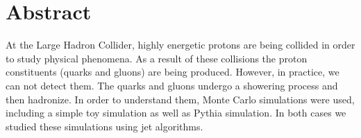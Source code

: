 
\chapter*{Abstract} 
At the Large Hadron Collider, highly energetic protons are being collided in order to study physical phenomena. As a result of these collisions the proton constituents (quarks and gluons) are being produced.
However, in practice, we can not detect them.
The quarks and gluons undergo a showering process and then hadronize.
In order to understand them, Monte Carlo simulations  were used, including a simple toy simulation as well as Pythia simulation. In both cases we studied these simulations using jet algorithms.

%
%
%
%




